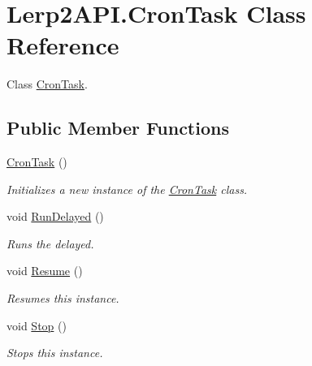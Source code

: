 \hypertarget{class_lerp2_a_p_i_1_1_cron_task}{}\section{Lerp2\+A\+P\+I.\+Cron\+Task Class Reference}
\label{class_lerp2_a_p_i_1_1_cron_task}


Class \hyperlink{class_lerp2_a_p_i_1_1_cron_task}{Cron\+Task}.  


\subsection*{Public Member Functions}
\begin{DoxyCompactItemize}
\item 
\hyperlink{class_lerp2_a_p_i_1_1_cron_task_acfd4e6a51d2a3bd82513bd9ea7f1b10d}{Cron\+Task} ()
\begin{DoxyCompactList}\small\item\em Initializes a new instance of the \hyperlink{class_lerp2_a_p_i_1_1_cron_task}{Cron\+Task} class. \end{DoxyCompactList}\item 
void \hyperlink{class_lerp2_a_p_i_1_1_cron_task_a5d4988057cfff7ce9cfdfab1068dfbbc}{Run\+Delayed} ()
\begin{DoxyCompactList}\small\item\em Runs the delayed. \end{DoxyCompactList}\item 
void \hyperlink{class_lerp2_a_p_i_1_1_cron_task_a48458e0d47de3ae5e503ea0942adb076}{Resume} ()
\begin{DoxyCompactList}\small\item\em Resumes this instance. \end{DoxyCompactList}\item 
void \hyperlink{class_lerp2_a_p_i_1_1_cron_task_a4e894b06fb0e33fc1372d84cbbd24816}{Stop} ()
\begin{DoxyCompactList}\small\item\em Stops this instance. \end{DoxyCompactList}\end{DoxyCompactItemize}
